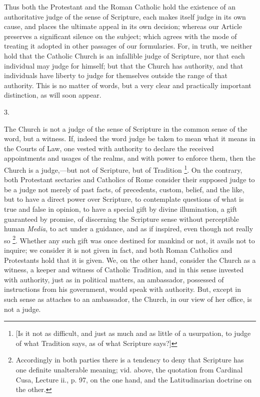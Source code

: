 Thus both the Protestant and the Roman Catholic hold the existence
of an authoritative judge of the sense of Scripture, each makes
itself judge in its own cause, and places the ultimate appeal in its
own decision; whereas our Article preserves a significant silence on
the subject; which agrees with the mode of treating it adopted in
other passages of our formularies. For, in truth, we neither hold that
the Catholic Church is an infallible judge of Scripture, nor that each
individual may judge for himself; but that the Church has authority,
and that individuals have liberty to judge for themselves outside the
range of that authority. This is no matter of words, but a very clear
and practically important distinction, as will soon appear.

3.

The Church is not a judge of the sense of Scripture in the common
sense of the word, but a witness. If, indeed the word judge be taken
to mean what it means in the Courts of Law, one vested with authority
to declare the received appointments and usages of the realms, and
with power to enforce them, then the Church is a judge,—but not of
Scripture, but of Tradition \footnote{[Is it not as difficult, and just as much and as little of a
usurpation, to judge of what Tradition says, as of what Scripture
says?]}.
On the contrary, both Protestant sectaries and Catholics of Rome
consider their supposed judge to be a judge not merely of past facts,
of precedents, custom, belief, and the like, but to have a direct
power over Scripture, to contemplate questions of what is true and
false in opinion, to have a special gift by divine illumination, a
gift guaranteed by promise, of discerning the Scripture sense without
perceptible human \emph{Media}, to act under a guidance, and as if
inspired, even though not really so \footnote{Accordingly in both parties there is a
tendency to deny that Scripture has one definite unalterable meaning;
vid. above, the quotation from Cardinal Cusa, Lecture ii., p. 97, on
the one hand, and the Latitudinarian doctrine on the other.}. Whether any such gift was once destined for mankind or
not, it avails not to inquire; we consider it is not given in fact,
and both Roman Catholics and Protestants hold that it is given. We, on
the other hand, consider the Church as a witness, a keeper and witness
of Catholic Tradition, and in this sense invested with authority, just
as in political matters, an ambassador, possessed of instructions from
his government, would speak with authority. But, except in such sense
as attaches to an ambassador, the Church, in our view of her office,
is not a judge.


